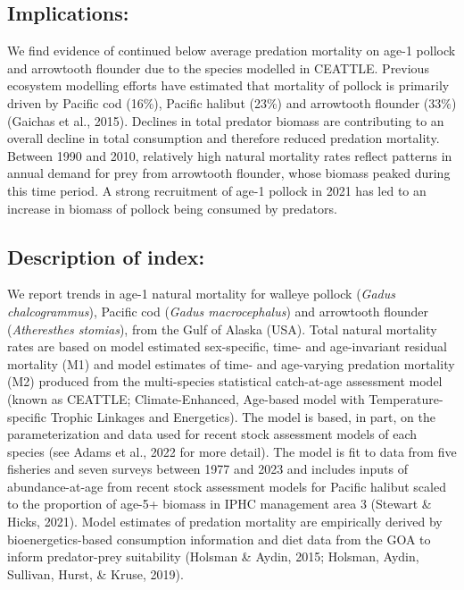 \documentclass[
]{article}
\begin{document}
\hypertarget{implications}{%
\subsection{Implications:}\label{implications}}

We find evidence of continued below average predation mortality on age-1
pollock and arrowtooth flounder due to the species modelled in CEATTLE.
Previous ecosystem modelling efforts have estimated that mortality of
pollock is primarily driven by Pacific cod (16\%), Pacific halibut
(23\%) and arrowtooth flounder (33\%)(Gaichas et al., 2015). Declines in
total predator biomass are contributing to an overall decline in total
consumption and therefore reduced predation mortality. Between 1990 and
2010, relatively high natural mortality rates reflect patterns in annual
demand for prey from arrowtooth flounder, whose biomass peaked during
this time period. A strong recruitment of age-1 pollock in 2021 has led
to an increase in biomass of pollock being consumed by predators.

\hypertarget{description-of-index}{%
\subsection{Description of index:}\label{description-of-index}}

We report trends in age-1 natural mortality for walleye pollock
(\emph{Gadus chalcogrammus}), Pacific cod (\emph{Gadus macrocephalus})
and arrowtooth flounder (\emph{Atheresthes stomias}), from the Gulf of
Alaska (USA). Total natural mortality rates are based on model estimated
sex-specific, time- and age-invariant residual mortality (M1) and model
estimates of time- and age-varying predation mortality (M2) produced
from the multi-species statistical catch-at-age assessment model (known
as CEATTLE; Climate-Enhanced, Age-based model with Temperature-specific
Trophic Linkages and Energetics). The model is based, in part, on the
parameterization and data used for recent stock assessment models of
each species (see Adams et al., 2022 for more detail). The model is fit
to data from five fisheries and seven surveys between 1977 and 2023 and
includes inputs of abundance-at-age from recent stock assessment models
for Pacific halibut scaled to the proportion of age-5+ biomass in IPHC
management area 3 (Stewart \& Hicks, 2021). Model estimates of predation
mortality are empirically derived by bioenergetics-based consumption
information and diet data from the GOA to inform predator-prey
suitability (Holsman \& Aydin, 2015; Holsman, Aydin, Sullivan, Hurst, \&
Kruse, 2019).
\end{document}
